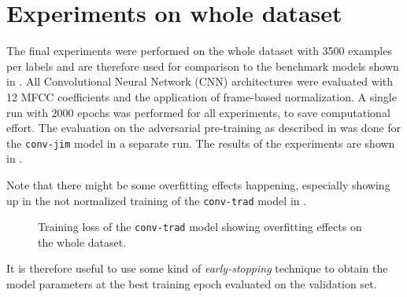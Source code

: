 
\section{Experiments on whole dataset}\label{sec:exp_final}
The final experiments were performed on the whole dataset with 3500 examples per labels and are therefore used for comparison to the benchmark models shown in .
All Convolutional Neural Network (CNN) architectures were evaluated with 12 MFCC coefficients and the application of frame-based normalization.
A single run with 2000 epochs was performed for all experiments, to save computational effort.
The evaluation on the adversarial pre-training as described in  was done for the \texttt{conv-jim} model in a separate run.
The results of the experiments are shown in .

Note that there might be some overfitting effects happening, especially showing up in the not normalized training of the \texttt{conv-trad} model in .
\begin{figure}[!ht]
  \centering
  \caption{Training loss of the \texttt{conv-trad} model showing overfitting effects on the whole dataset.}
  \label{fig:exp_final_loss_conv-trad}
\end{figure}
\FloatBarrier
\noindent
It is therefore useful to use some kind of \emph{early-stopping} technique to obtain the model parameters at the best training epoch evaluated on the validation set.
